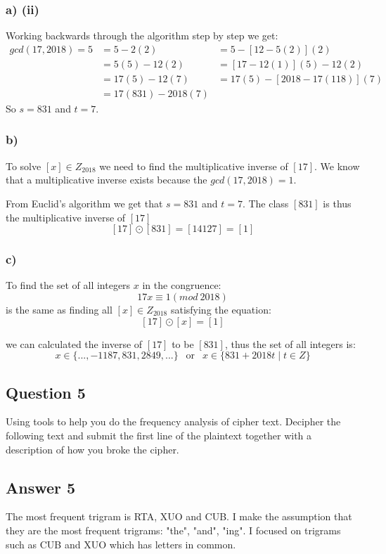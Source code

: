 \documentclass{article}
\begin{document}
	\subsubsection*{a) (ii)}
	Working backwards through the algorithm step by step we get:
	\begin{align*}
	gcd(17,2018) =5	& = 5-2(2) 		&= 5-[12-5(2)](2) \\
		 			& = 5(5)-12(2) 	&=[17-12(1)](5)-12(2) \\
			 		& = 17(5)-12(7)	&= 17(5)-[2018-17(118)](7) \\ 
			 		& = 17(831)-2018(7) &
	\end{align*}
	So $s = 831$ and $t=7$.
	
	\subsubsection*{b)}
	To solve $[x] \in Z_{2018}$ we need to find the multiplicative inverse of $[17]$. We know that a multiplicative inverse exists because the $gcd(17,2018)=1$. 
	
	From Euclid's algorithm we get that $s = 831$ and $t=7$. The class $[831]$ is thus the multiplicative inverse of $[17]$ 
	$$
	[17] \odot [831] = [14127] = [1]
	$$
	
	\subsubsection*{c)}
	To find the set of all integers $x$ in the congruence:
	$$
	17x \equiv 1 (mod \ 2018)
	$$
	is the same as finding all $[x] \in Z_{2018}$ satisfying the equation:
	$$
	[17] \odot [x] = [1]
	$$
	
	we can calculated the inverse of $[17]$ to be $[831]$, thus the set of all integers is:
	$$
	x \in \{...,-1187,831,2849,...\} \ \ \text{ or } \ \ x \in \{831+2018t \mid t \in Z\}
	$$
	
	\subsection*{Question 5}
	Using tools to help you do the frequency analysis of cipher text. Decipher the following text and submit the first line of the plaintext together with a description of how you broke the cipher.
	
	\subsection*{Answer 5} 
	The most frequent trigram is RTA, XUO and CUB. I make the assumption that they are the most frequent trigrams: "the", "and", "ing". I focused on trigrams such as CUB and XUO which has letters in common.
	
\end{document}
